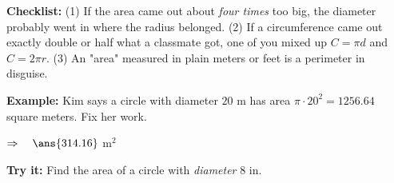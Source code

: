 \documentclass[12pt]{article}
\begin{document}

\begin{formulabox}
\textbf{Checklist:} (1) If the area came out about \emph{four times} too big,
the diameter probably went in where the radius belonged. (2) If a
circumference came out exactly double or half what a classmate got, one of you
mixed up $C = \pi d$ and $C = 2\pi r$. (3) An "area" measured in plain meters
or feet is a perimeter in disguise.
\end{formulabox}

\begin{examplebox}
\textbf{Example:} \quad Kim says a circle with diameter $20$ m has area
$\pi \cdot 20^2 = 1256.64$ square meters. Fix her work.

$\Rightarrow\quad \ans{314.16}$ m$^2$
\end{examplebox}

\begin{tryitbox}
\textbf{Try it:} \quad Find the area of a circle with \emph{diameter} $8$
in.\\[2pt]
\end{tryitbox}
\end{document}
